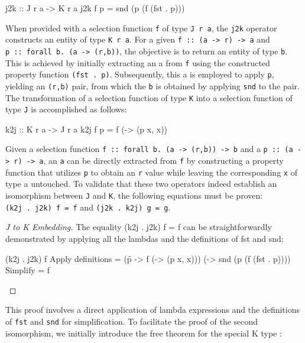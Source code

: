 \documentclass[runningheads]{llncs}
\begin{document}
\begin{code}
j2k :: J r a -> K r a
j2k f p = snd (p (f (fst . p)))
\end{code}

When provided with a selection function \texttt{f} of type
\texttt{J\ r\ a}, the \texttt{j2k} operator constructs an entity of type
\texttt{K\ r\ a}. For a given
\texttt{f\ ::\ (a\ -\textgreater{}\ r)\ -\textgreater{}\ a} and
\texttt{p\ ::\ forall\ b.\ (a\ -\textgreater{}\ (r,b))}, the objective
is to return an entity of type \texttt{b}. This is achieved by initially
extracting an a from \texttt{f} using the constructed property function
\texttt{(fst\ .\ p)}. Subsequently, this a is employed to apply
\texttt{p}, yielding an \texttt{(r,b)} pair, from which the \texttt{b}
is obtained by applying \texttt{snd} to the pair. The transformation of
a selection function of type \texttt{K} into a selection function of
type \texttt{J} is accomplished as follows:

\begin{code}
k2j :: K r a -> J r a
k2j f p = f (\x -> (p x, x)) 
\end{code}

Given a selection function
\texttt{f\ ::\ forall\ b.\ (a\ -\textgreater{}\ (r,b))\ -\textgreater{}\ b}
and a \texttt{p\ ::\ (a\ -\textgreater{}\ r)\ -\textgreater{}\ a}, an
\texttt{a} can be directly extracted from \texttt{f} by constructing a
property function that utilizes \texttt{p} to obtain an \texttt{r} value
while leaving the corresponding \texttt{x} of type a untouched. To
validate that these two operators indeed establish an isomorphism
between \texttt{J} and \texttt{K}, the following equations must be
proven: \texttt{(k2j\ .\ j2k)\ f\ =\ f} and
\texttt{(j2k\ .\ k2j)\ g\ =\ g}.

\begin{proof}[J to K Embedding]
The equality (k2j . j2k) f = f can be straightforwardly demonstrated by applying all the 
lambdas and the definitions of fst and snd:

\begin{haskell}
(k2j . j2k) f
{{Apply definitions}}
= (\f p -> f (\x -> (p x, x))) (\p -> snd (p (f (fst . p))))
{{Simplify }}
= f
\end{haskell}

\end{proof}

This proof involves a direct application of lambda expressions and the
definitions of \texttt{fst} and \texttt{snd} for simplification. To
facilitate the proof of the second isomorphism, we initially introduce
the free theorem for the special K type \cite{wadler1989theorems}:
\end{document}
